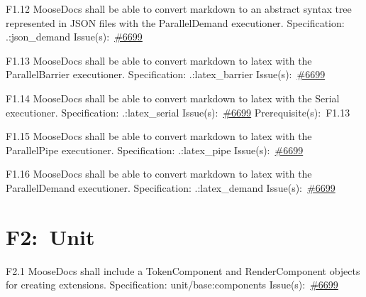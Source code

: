 \begin{Requirement}{F1.12}
MooseDocs shall be able to convert markdown to an abstract syntax tree represented in JSON files with the ParallelDemand executioner.
\newline
Specification: .:json\_demand
\newline
Issue(s):~\href{https://github.com/idaholab/moose/issues/6699}{\#6699}
\end{Requirement}

\begin{Requirement}{F1.13}
MooseDocs shall be able to convert markdown to latex with the ParallelBarrier executioner.
\newline
Specification: .:latex\_barrier
\newline
Issue(s):~\href{https://github.com/idaholab/moose/issues/6699}{\#6699}
\end{Requirement}

\begin{Requirement}{F1.14}
MooseDocs shall be able to convert markdown to latex with the Serial executioner.
\newline
Specification: .:latex\_serial
\newline
Issue(s):~\href{https://github.com/idaholab/moose/issues/6699}{\#6699}
\newline
Prerequisite(s):~F1.13
\end{Requirement}

\begin{Requirement}{F1.15}
MooseDocs shall be able to convert markdown to latex with the ParallelPipe executioner.
\newline
Specification: .:latex\_pipe
\newline
Issue(s):~\href{https://github.com/idaholab/moose/issues/6699}{\#6699}
\end{Requirement}

\begin{Requirement}{F1.16}
MooseDocs shall be able to convert markdown to latex with the ParallelDemand executioner.
\newline
Specification: .:latex\_demand
\newline
Issue(s):~\href{https://github.com/idaholab/moose/issues/6699}{\#6699}
\end{Requirement}
\section*{F2:~Unit}
\begin{Requirement}{F2.1}
MooseDocs shall include a TokenComponent and RenderComponent objects for creating extensions.
\newline
Specification: unit/base:components
\newline
Issue(s):~\href{https://github.com/idaholab/moose/issues/6699}{\#6699}
\end{Requirement}

